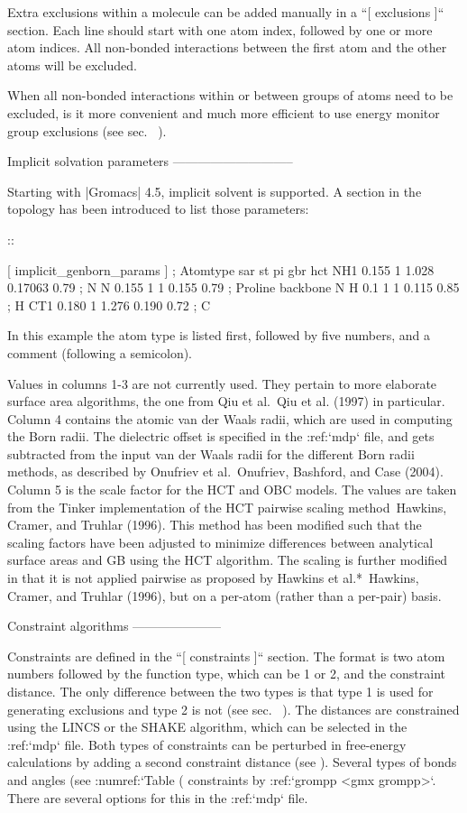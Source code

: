 Extra exclusions within a molecule can be added manually in a
``[ exclusions ]`` section. Each line should start with one
atom index, followed by one or more atom indices. All non-bonded
interactions between the first atom and the other atoms will be
excluded.

When all non-bonded interactions within or between groups of atoms need
to be excluded, is it more convenient and much more efficient to use
energy monitor group exclusions (see
sec. 
).

Implicit solvation parameters
-----------------------------

Starting with |Gromacs| 4.5, implicit solvent is supported. A section in
the topology has been introduced to list those parameters:

::

    [ implicit_genborn_params ]
    ; Atomtype  sar     st   pi      gbr      hct
    NH1         0.155   1    1.028   0.17063  0.79 ; N
    N           0.155   1    1       0.155    0.79 ; Proline backbone N
    H           0.1     1    1       0.115    0.85 ; H
    CT1         0.180   1    1.276   0.190    0.72 ; C

In this example the atom type is listed first, followed by five numbers,
and a comment (following a semicolon).

Values in columns 1-3 are not currently used. They pertain to more
elaborate surface area algorithms, the one from Qiu et al. Qiu et al.
(1997) in particular. Column 4 contains the atomic van der Waals radii,
which are used in computing the Born radii. The dielectric offset is
specified in the 
:ref:`mdp` file, and gets subtracted from
the input van der Waals radii for the different Born radii methods, as
described by Onufriev et al. Onufriev, Bashford, and Case (2004).
Column 5 is the scale factor for the HCT and OBC models. The values are
taken from the Tinker implementation of the HCT pairwise scaling
method Hawkins, Cramer, and Truhlar (1996). This method has been
modified such that the scaling factors have been adjusted to minimize
differences between analytical surface areas and GB using the HCT
algorithm. The scaling is further modified in that it is not applied
pairwise as proposed by Hawkins et al.* Hawkins, Cramer, and Truhlar
(1996), but on a per-atom (rather than a per-pair) basis.

Constraint algorithms
---------------------

Constraints are defined in the ``[ constraints ]`` section.
The format is two atom numbers followed by the function type, which can
be 1 or 2, and the constraint distance. The only difference between the
two types is that type 1 is used for generating exclusions and type 2 is
not (see sec. 
). The distances are
constrained using the LINCS or the SHAKE algorithm, which can be
selected in the :ref:`mdp` file. Both types of constraints
can be perturbed in free-energy calculations by adding a second
constraint distance (see 
).
Several types of bonds and angles (see
:numref:`Table (%
constraints by :ref:`grompp <gmx grompp>`. There are several options for
this in the :ref:`mdp` file.

